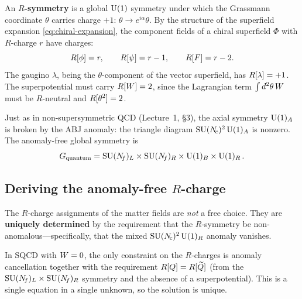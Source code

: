 \documentclass[11pt,a4paper]{article}
\begin{document}
\begin{definition}[$R$-symmetry]
\label{def:R-symmetry}
An \textbf{$R$-symmetry} is a global $\mathrm{U}(1)$ symmetry under which the
Grassmann coordinate $\theta$ carries charge $+1$:
$\theta \to e^{i\alpha} \theta$.  By the structure of the superfield
expansion \eqref{eq:chiral-expansion}, the component fields of a
chiral superfield $\Phi$ with $R$-charge $r$ have charges:
\begin{equation}
  R[\phi] = r, \qquad
  R[\psi] = r - 1, \qquad
  R[F] = r - 2.
  \label{eq:R-components}
\end{equation}
The gaugino $\lambda$, being the $\theta$-component of the vector
superfield, has $R[\lambda] = +1$.  The superpotential must
carry $R[W] = 2$, since the Lagrangian term
$\int d^2\theta\, W$ must be $R$-neutral and $R[\theta^2] = 2$.
\end{definition}

\begin{warningbox}[title={The axial $\UU{1}_A$ is anomalous}]
Just as in non-supersymmetric QCD (Lecture~1, \S3), the axial symmetry
$\UU{1}_A$ is broken by the ABJ anomaly: the triangle diagram
$\mathrm{SU}(N_{\!c})^2\,\mathrm{U}(1)_A$ is nonzero.  The anomaly-free global symmetry is
\begin{equation}
  G_{\text{quantum}}
  = \mathrm{SU}(N_{\!f})_L \times \mathrm{SU}(N_{\!f})_R \times \mathrm{U}(1)_B \times \mathrm{U}(1)_R\,.
  \label{eq:global-sym-quantum}
\end{equation}
\end{warningbox}


\subsection{Deriving the anomaly-free $R$-charge}
\label{sec:R-charge-derivation}

The $R$-charge assignments of the matter fields are \emph{not} a free
choice.  They are \textbf{uniquely determined} by the requirement that
the $R$-symmetry be non-anomalous---specifically, that the mixed
$\mathrm{SU}(N_{\!c})^2\, \mathrm{U}(1)_R$ anomaly vanishes.

\begin{remark}
\label{rem:R-unique}
In SQCD with $W = 0$, the only constraint on the $R$-charges is
anomaly cancellation together with the requirement $R[Q] =
R[\widetilde{Q}]$ (from the $\mathrm{SU}(N_{\!f})_L \times \mathrm{SU}(N_{\!f})_R$
symmetry and the absence of a superpotential).  This is a single
equation in a single unknown, so the solution is unique.
\end{remark}
\end{document}
